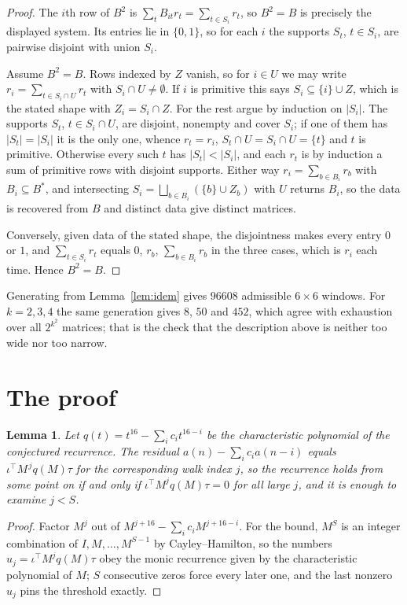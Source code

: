 \documentclass[11pt,a4paper]{article}
\theoremstyle{plain}
\newtheorem{lemma}[theorem]{Lemma}
\theoremstyle{definition}
\begin{document}
\begin{proof}
The $i$th row of $B^2$ is $\sum_t B_{it}r_t=\sum_{t\in S_i}r_t$, so $B^2=B$ is precisely the
displayed system. Its entries lie in $\{0,1\}$, so for each $i$ the supports $S_t$,
$t\in S_i$, are pairwise disjoint with union $S_i$.

Assume $B^2=B$. Rows indexed by $Z$ vanish, so for $i\in U$ we may write
$r_i=\sum_{t\in S_i\cap U}r_t$ with $S_i\cap U\neq\emptyset$. If $i$ is primitive this says
$S_i\subseteq\{i\}\cup Z$, which is the stated shape with $Z_i=S_i\cap Z$. For the rest argue
by induction on $|S_i|$. The supports $S_t$, $t\in S_i\cap U$, are disjoint, nonempty and
cover $S_i$; if one of them has $|S_t|=|S_i|$ it is the only one, whence $r_t=r_i$,
$S_t\cap U=S_i\cap U=\{t\}$ and $t$ is primitive. Otherwise every such $t$ has
$|S_t|<|S_i|$, and each $r_t$ is by induction a sum of primitive rows with disjoint supports.
Either way $r_i=\sum_{b\in B_i}r_b$ with $B_i\subseteq B^{\ast}$, and intersecting
$S_i=\bigsqcup_{b\in B_i}(\{b\}\cup Z_b)$ with $U$ returns $B_i$, so the data is recovered
from $B$ and distinct data give distinct matrices.

Conversely, given data of the stated shape, the disjointness makes every entry $0$ or $1$, and
$\sum_{t\in S_i}r_t$ equals $0$, $r_b$, $\sum_{b\in B_i}r_b$ in the three cases, which is
$r_i$ each time. Hence $B^2=B$.
\end{proof}

Generating from Lemma~\ref{lem:idem} gives $96608$ admissible $6\times6$ windows. For
$k=2,3,4$ the same generation gives $8$, $50$ and $452$, which agree with exhaustion over all
$2^{k^2}$ matrices; that is the check that the description above is neither too wide nor too
narrow.

\section{The proof}

\begin{lemma}\label{lem:crit}
Let $q(t)=t^{16}-\sum_i c_it^{16-i}$ be the characteristic polynomial of the
conjectured recurrence. The residual $a(n)-\sum_ic_ia(n-i)$ equals
$\iota^{\!\top}M^{\,j}q(M)\tau$ for the corresponding walk index $j$, so the recurrence
holds from some point on if and only if $\iota^{\!\top}M^{j}q(M)\tau=0$ for all large $j$,
and it is enough to examine $j<S$.
\end{lemma}

\begin{proof}
Factor $M^{j}$ out of $M^{j+16}-\sum_ic_iM^{j+16-i}$. For the bound, $M^{S}$
is an integer combination of $I,M,\dots,M^{S-1}$ by Cayley--Hamilton, so the numbers
$u_j=\iota^{\!\top}M^{j}q(M)\tau$ obey the monic recurrence given by the characteristic
polynomial of $M$; $S$ consecutive zeros force every later one, and the last nonzero $u_j$
pins the threshold exactly.
\end{proof}
\end{document}

